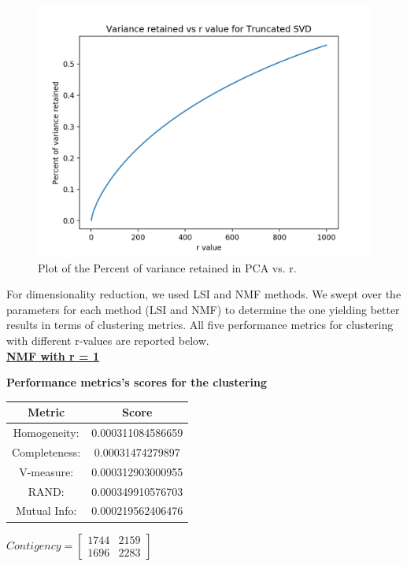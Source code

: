 \documentclass{report}
\begin{document}
\begin{figure}
  \centering
  \includegraphics[width=\linewidth]{p3_variance_r.png}
  \vspace*{-20mm}
  \caption{Plot of the Percent of variance retained in PCA vs. r.}
  \label{fig:variance_r}
\end{figure}

For dimensionality reduction, we used LSI and NMF methods. We swept over the parameters for each method (LSI and NMF) to determine the one yielding better results in terms of clustering metrics. All five performance metrics for clustering with different r-values are reported below. \\


\underline{\textbf{NMF with r = 1}} \\ 

\begin{center}
	\textbf{Performance metrics's scores for the clustering} \\ \vspace{10pt}
	\begin{tabular}{*{2}{c}}
		\toprule
		\textbf{Metric} & \textbf{Score} \\
		\midrule	
		Homogeneity: & 0.000311084586659 \\
		\midrule
		Completeness: & 0.00031474279897 \\
		\midrule
		V-measure: & 0.000312903000955 \\
		\midrule
		RAND: & 0.000349910576703 \\
		\midrule
		Mutual Info: & 0.000219562406476 \\
		\bottomrule
	\end{tabular}
	\qquad
	$Contigency = \left[ \begin{array}{*{2}{c}}
			    1744 & 2159\\
			    1696 & 2283				
				\end{array}\right]
			$
\end{center}
\end{document}

